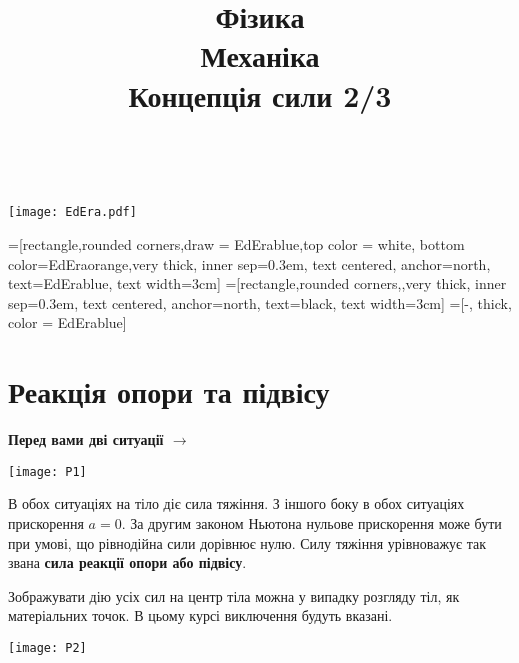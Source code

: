 \documentclass[a4paper,12pt]{article}
\title{\textbf{Фізика} \textbf{\MakeUppercase{\romannumeral1}}\\
	\textbf{Механіка}\\
	\textbf{Концепція сили 2/3}}
\date{}
\author{}
\begin{document}
\thispagestyle{empty}
\textcolor{white}{.}
\vfill
\begin{center} 
\vspace{-6cm} 
\texttt{[image: EdEra.pdf]}
\end{center}
\vfill
\newpage
\maketitle
\vspace{3cm}
\tableofcontents
\newpage


=[rectangle,rounded corners,draw = EdErablue,top color = white, bottom color=EdEraorange,very thick, inner sep=0.3em, text centered, anchor=north, text=EdErablue, text width=3cm]
=[rectangle,rounded corners,,very thick, inner sep=0.3em, text centered, anchor=north, text=black, text width=3cm]
=[-, thick, color = EdErablue]

\newpage

\section{Реакція опори та підвісу}
\textbf{\textcolor{EdErablue}{Перед вами дві ситуації $\rightarrow$}}
\begin{center}
\texttt{[image: P1]}
\end{center}
В обох ситуаціях на тіло діє сила тяжіння. З іншого боку в обох ситуаціях прискорення $a = 0$. За другим законом Ньютона нульове прискорення може бути при умові, що рівнодійна сили дорівнює нулю. Силу тяжіння урівноважує так звана \textcolor{EdErablue}{\textbf{сила реакції опори або підвісу}}. 

Зображувати дію усіх сил на центр тіла можна у випадку розгляду тіл, як матеріальних точок. В цьому курсі виключення будуть вказані. 
\begin{center}
\texttt{[image: P2]}
\end{center}
\newpage
\end{document}
